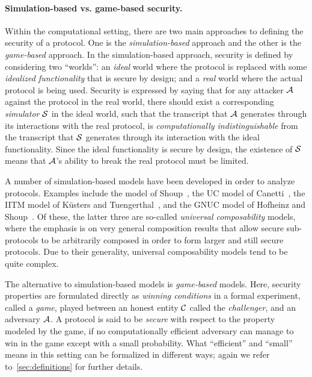 \paragraph{Simulation-based vs. game-based security.}
Within the computational setting,
there are two main approaches to defining the security of a protocol. 
One is the \emph{simulation-based} approach
and the other is the \emph{game-based} approach.
In the simulation-based approach,
security is defined by considering two ``worlds'': 
an \emph{ideal} world where the protocol is replaced with some \emph{idealized functionality}  that is secure by design;
and a \emph{real} world where the actual protocol is being used.
Security is expressed by saying that for any attacker $\A$ against the protocol in the real world,
there should exist a corresponding \emph{simulator} $\A[S]$ in the ideal world,
such that the transcript that $\A$ generates through its interactions with the real protocol,
is \emph{computationally indistinguishable} from the transcript that $\A[S]$ generates through its interaction with the ideal functionality.
Since the ideal functionality is secure by design,
the existence of $\A[S]$ means that $\A$'s ability to break the real protocol must be limited.

A number of simulation-based models have been developed in order to analyze protocols.
Examples include the model of Shoup~\cite{EPRINT:Shoup99b},
the UC model of Canetti~\cite{FOCS:Canetti01},
the IITM model of Küsters and Tuengerthal~\cite{EPRINT:KueTue13},
and the GNUC model of Hofheinz and Shoup~\cite{JC:HofSho15}.
Of these,
the latter three are so-called \emph{universal composability} models,
where the emphasis is on very general composition results that allow secure sub-protocols to be arbitrarily composed in order to form larger and still secure protocols.
Due to their generality,
universal composability models tend to be quite complex.  

The alternative to simulation-based models is \emph{game-based} models.
Here,
security properties are formulated directly as \emph{winning conditions} in a formal experiment,
called a \emph{game},
played between an honest entity $\A[C]$ called the \emph{challenger},
and an adversary $\A$.
A protocol is said to be \emph{secure} with respect to the property modeled by the game,
if no computationally efficient adversary can manage to win in the game except with a small probability.
What ``efficient'' and ``small'' means in this setting can be formalized in different ways;
again we refer to~\cref{sec:definitions} for further details.

